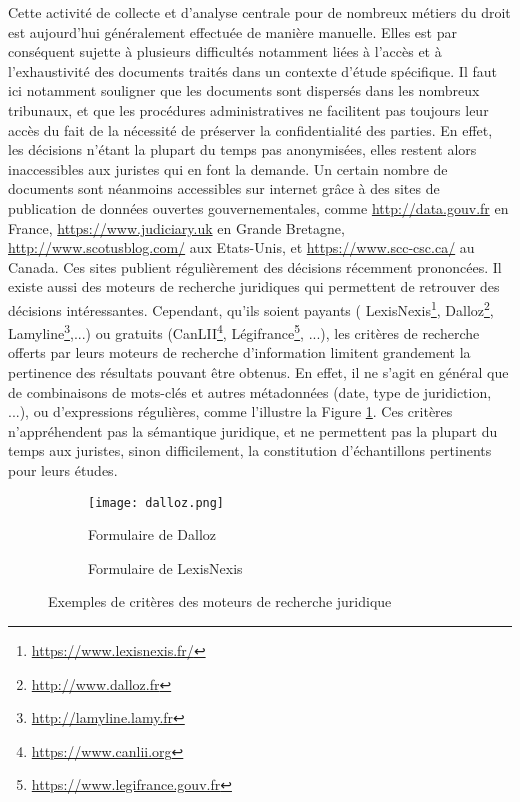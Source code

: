 Cette activité de collecte et d'analyse centrale pour de nombreux métiers du droit est aujourd'hui généralement effectuée de manière manuelle. Elles est par conséquent sujette à plusieurs difficultés notamment liées à l'accès et à l'exhaustivité des documents traités dans un contexte d'étude spécifique. Il faut ici notamment souligner que les documents sont dispersés dans les nombreux tribunaux, et que les procédures administratives ne facilitent pas toujours leur accès du fait de la nécessité de préserver la confidentialité des parties. En effet, les décisions n'étant la plupart du temps pas anonymisées, elles restent alors inaccessibles aux juristes qui en font la demande. Un certain nombre de documents sont néanmoins accessibles sur internet grâce à des sites de publication de données ouvertes gouvernementales, comme \url{http://data.gouv.fr} en France, \url{https://www.judiciary.uk} en Grande Bretagne, \url{http://www.scotusblog.com/} aux Etats-Unis, et \url{https://www.scc-csc.ca/} au Canada. Ces sites publient régulièrement des décisions récemment prononcées.  Il existe aussi des moteurs de recherche juridiques qui permettent de retrouver des décisions intéressantes. Cependant, qu'ils soient payants ( LexisNexis\footnote{\url{https://www.lexisnexis.fr/}}, Dalloz\footnote{\url{http://www.dalloz.fr}}, Lamyline\footnote{\url{http://lamyline.lamy.fr}},...) ou gratuits (CanLII\footnote{\url{https://www.canlii.org}}, Légifrance\footnote{\url{https://www.legifrance.gouv.fr}}, ...), les critères de recherche offerts par leurs moteurs de recherche d'information limitent grandement la pertinence des résultats pouvant être obtenus. En effet, il ne s'agit en général que de combinaisons de mots-clés et autres métadonnées (date, type de juridiction, ...), ou d'expressions régulières, comme l'illustre la Figure \ref{fig:intro:juriSearchForm}. Ces critères n'appréhendent pas la sémantique juridique, et ne permettent pas la plupart du temps aux juristes, sinon difficilement, la constitution d'échantillons pertinents pour leurs études. 

\begin{figure}[!htb]
	\centering

	\begin{subfigure}[t]{0.45\textwidth}
		\centering
		\texttt{[image: dalloz.png]}
		\caption{Formulaire de Dalloz}
	\end{subfigure}\hfill
	\begin{subfigure}[t]{0.55\textwidth}
		\centering
		\caption{Formulaire de LexisNexis}
	\end{subfigure}%
	\caption{Exemples de critères des moteurs de recherche juridique}\label{fig:intro:juriSearchForm}
\end{figure}

